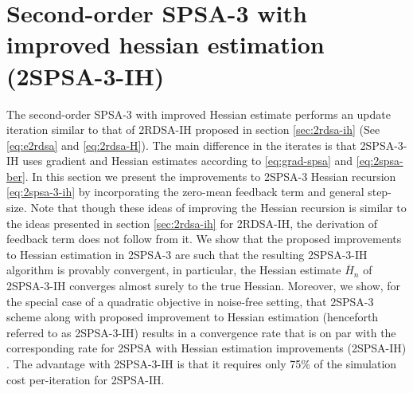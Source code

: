  \chapter{Second-order SPSA-3 with improved hessian estimation (2SPSA-3-IH)}
\label{sec:2spsa-3-ih}
The second-order SPSA-3 with improved Hessian estimate performs an update iteration similar to that of 2RDSA-IH proposed in section \ref{sec:2rdsa-ih} (See \eqref{eq:e2rdsa} and \eqref{eq:2rdsa-H}). The main difference in the iterates is that 2SPSA-3-IH uses gradient and Hessian estimates according to \eqref{eq:grad-spsa} and \eqref{eq:2spsa-ber}. In this section we present the improvements to 2SPSA-3 Hessian recursion \eqref{eq:2spsa-3-ih} by incorporating the zero-mean feedback term and general step-size. Note that though these ideas of improving the Hessian recursion is similar to the ideas presented in section \ref{sec:2rdsa-ih} for 2RDSA-IH, the derivation of feedback term does not follow from it. We show that the proposed improvements to Hessian estimation in 2SPSA-3 are such  that the resulting 2SPSA-3-IH algorithm is provably convergent, in particular, the Hessian estimate $\overline H_n$ of 2SPSA-3-IH converges almost surely to the true Hessian. Moreover, we show, for the special case of a quadratic objective in noise-free setting, that 2SPSA-3 scheme along with proposed improvement to Hessian estimation (henceforth referred to as 2SPSA-3-IH) results in a convergence rate that is on par with the corresponding rate for 2SPSA with Hessian estimation improvements (2SPSA-IH) \cite{spall-jacobian}. The advantage with 2SPSA-3-IH is that it requires only 75\% of the simulation cost per-iteration for 2SPSA-IH.

